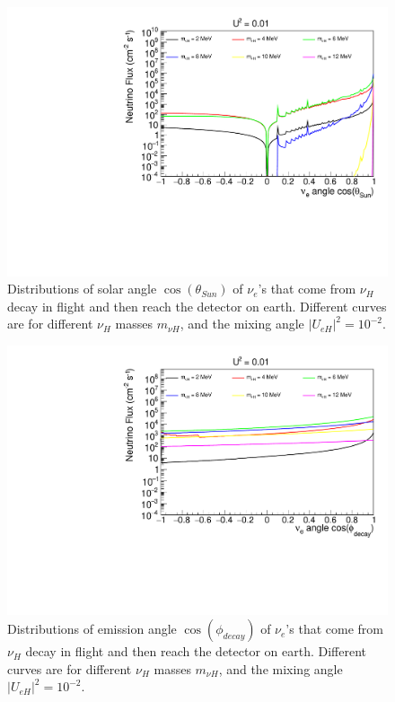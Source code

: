 \documentclass[%
 reprint,
 amsmath,amssymb,
 aps,
 prd,
floatfix,
twocolumn,
]{revtex4-1}
\begin{document}
\begin{figure}[!htbp]
\includegraphics[width=0.99\columnwidth]{../plots/DecayInFlightNuLCosthetaSun_U0.01_AllMass_linXlogY.pdf}
\caption{Distributions of solar angle $\cos(\theta_{Sun})$ of $\nu_e$'s that come from $\nu_H$ decay in flight and then reach the detector on earth. Different curves are for different $\nu_H$ masses $m_{\nu H}$, and the mixing angle $|U_{eH}|^2 = 10^{-2}$.}
\label{fig:DecayInFlightTheta_U1em2_AllMass}
\end{figure}

\begin{figure}[!htbp]
\includegraphics[width=0.99\columnwidth]{../plots/DecayInFlightNuLCosphiSun_U0.01_AllMass_linXlogY.pdf}
\caption{Distributions of emission angle $\cos(\phi_{decay})$ of $\nu_e$'s that come from $\nu_H$ decay in flight and then reach the detector on earth. Different curves are for different $\nu_H$ masses $m_{\nu H}$, and the mixing angle $|U_{eH}|^2 = 10^{-2}$.}
\label{fig:DecayInFlightPhi_U1em2_AllMass}
\end{figure}
\end{document}
